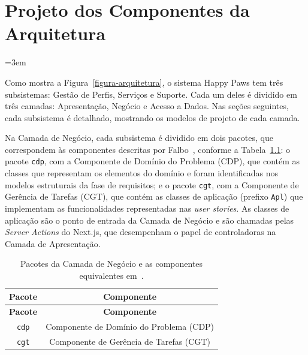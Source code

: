 \chapter{Projeto dos Componentes da Arquitetura}
\label{sec-componentes}
\vspace{-1cm}

\emergencystretch=3em

Como mostra a Figura~\ref{figura-arquitetura}, o sistema Happy Paws tem três subsistemas: Gestão de Perfis, Serviços e Suporte. Cada um deles é dividido em três camadas: Apresentação, Negócio e Acesso a Dados. Nas seções seguintes, cada subsistema é detalhado, mostrando os modelos de projeto de cada camada.

Na Camada de Negócio, cada subsistema é dividido em dois pacotes, que correspondem às componentes descritas por Falbo~\cite{falbo:notas18}, conforme a Tabela~\ref{tabela-pacotes}: o pacote \texttt{cdp}, com a Componente de Domínio do Problema (CDP), que contém as classes que representam os elementos do domínio e foram identificadas nos modelos estruturais da fase de requisitos; e o pacote \texttt{cgt}, com a Componente de Gerência de Tarefas (CGT), que contém as classes de aplicação (prefixo \texttt{Apl}) que implementam as funcionalidades representadas nas \textit{user stories}. As classes de aplicação são o ponto de entrada da Camada de Negócio e são chamadas pelas \emph{Server Actions} do Next.js, que desempenham o papel de controladoras na Camada de Apresentação.

\begin{footnotesize}
\begin{longtable}{|c|c|}
	\caption{Pacotes da Camada de Negócio e as componentes equivalentes em~\cite{falbo:notas18}.}
	\label{tabela-pacotes}\\\hline
	\rowcolor{lightgray}
	\textbf{Pacote} & \textbf{Componente} \\\hline
	\endfirsthead
	\hline
	\rowcolor{lightgray}
	\textbf{Pacote} & \textbf{Componente} \\\hline
	\endhead
	\texttt{cdp} & Componente de Domínio do Problema (CDP) \\\hline
	\texttt{cgt} & Componente de Gerência de Tarefas (CGT) \\\hline
\end{longtable}
\end{footnotesize}

